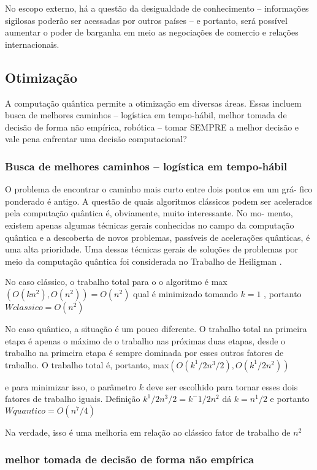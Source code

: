 No escopo externo,  há a questão da desigualdade de conhecimento – informações sigilosas poderão ser acessadas por outros países – e portanto, será possível aumentar o poder de barganha em meio as negociações de comercio e relações internacionais.

\subsection{Otimização}
A computação quântica permite a otimização em diversas áreas. Essas incluem busca de melhores caminhos – logística em tempo-hábil,  melhor tomada de decisão de forma não empírica, robótica – tomar SEMPRE a melhor decisão e vale pena enfrentar uma decisão computacional?

\subsubsection{Busca de melhores caminhos – logística em tempo-hábil}
O problema de encontrar o caminho mais curto entre dois pontos em um grá- fico ponderado é antigo. A questão de quais algoritmos clássicos podem ser acelerados pela computação quântica é, obviamente, muito interessante. No mo- mento, existem apenas algumas técnicas gerais conhecidas no campo da computação quântica e a descoberta de novos problemas, passíveis de acelerações quânticas, é uma alta prioridade. Uma dessas técnicas gerais de soluções de problemas por meio da computação quântica foi considerada no Trabalho de Heiligman  \cite{21}.

No caso clássico, o trabalho total para o o algoritmo é max $ (O(kn^2),  O(n^2)) = O(n^2) $  qual é minimizado tomando $ k = 1 $ , portanto $ W classico=O(n^2) $

No caso quântico, a situação é um pouco diferente. O trabalho total na primeira etapa é apenas o máximo de o trabalho nas próximas duas etapas, desde o trabalho na primeira etapa é sempre dominada por esses outros fatores de trabalho. O trabalho total é, portanto, max$ (O(k^1/2 n^3/2), O(k^1/2 n^2)) $

e para minimizar isso, o parâmetro $ k $ deve ser escolhido para tornar esses dois fatores de trabalho iguais. Definição $ k^1/2 n^3/2= k^-1/2 n^2 $ dá $ k = n^1/2 $ e portanto $W quantico = O(n^7/4) $

Na verdade, isso é uma melhoria em relação ao clássico fator de trabalho de $ n^2 $

\subsubsection{melhor tomada de decisão de forma não empírica}
